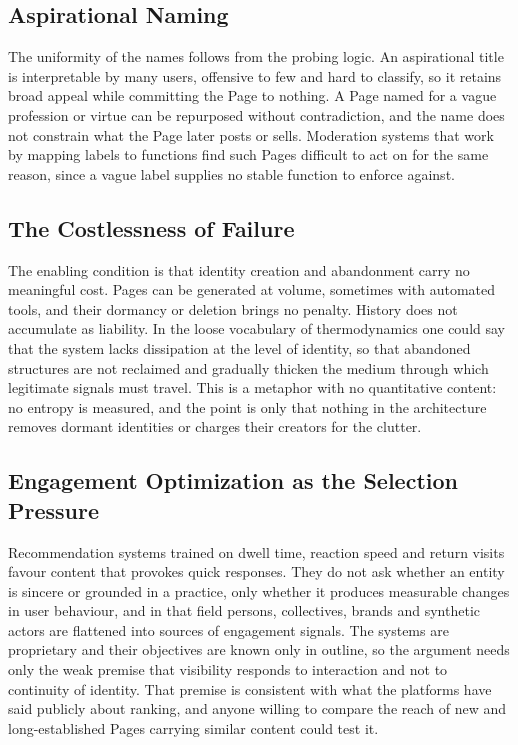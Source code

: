 \documentclass[12pt, a4paper]{article}
\begin{document}
\subsection{Aspirational Naming}

The uniformity of the names follows from the probing logic. An aspirational title is interpretable by many users, offensive to few and hard to classify, so it retains broad appeal while committing the Page to nothing. A Page named for a vague profession or virtue can be repurposed without contradiction, and the name does not constrain what the Page later posts or sells. Moderation systems that work by mapping labels to functions find such Pages difficult to act on for the same reason, since a vague label supplies no stable function to enforce against.

\subsection{The Costlessness of Failure}

The enabling condition is that identity creation and abandonment carry no meaningful cost. Pages can be generated at volume, sometimes with automated tools, and their dormancy or deletion brings no penalty. History does not accumulate as liability. In the loose vocabulary of thermodynamics one could say that the system lacks dissipation at the level of identity, so that abandoned structures are not reclaimed and gradually thicken the medium through which legitimate signals must travel. This is a metaphor with no quantitative content: no entropy is measured, and the point is only that nothing in the architecture removes dormant identities or charges their creators for the clutter.

\subsection{Engagement Optimization as the Selection Pressure}

Recommendation systems trained on dwell time, reaction speed and return visits favour content that provokes quick responses. They do not ask whether an entity is sincere or grounded in a practice, only whether it produces measurable changes in user behaviour, and in that field persons, collectives, brands and synthetic actors are flattened into sources of engagement signals. The systems are proprietary and their objectives are known only in outline, so the argument needs only the weak premise that visibility responds to interaction and not to continuity of identity. That premise is consistent with what the platforms have said publicly about ranking, and anyone willing to compare the reach of new and long-established Pages carrying similar content could test it.
\end{document}

